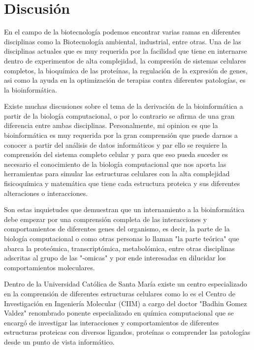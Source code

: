 \documentclass[a4paper, 12pt]{article}
\begin{document}
    
      
        
\section{Discusión}
    

En el campo de la biotecnología podemos encontrar varias ramas en diferentes disciplinas como la Biotecnología ambiental, industrial, entre otras. Una de las disciplinas actuales que es muy requerida por la facilidad que tiene en internarse dentro de experimentos de alta complejidad, la compresión de sistemas celulares completos, la bioquímica de las proteínas, la regulación de la expresión de genes, asi como la ayuda en la optimización de terapias contra diferentes patologías, es la bioinformática.

Existe muchas discusiones sobre el tema de la derivación de la bioinformática a partir de la biología computacional, o por lo contrario se afirma de una gran diferencia entre ambas disciplinas.
Personalmente, mi opinion es que la bioinformática es muy requerida por la gran comprensión que puede darnos a conocer a partir del análisis de datos informáticos y par ello se requiere la comprensión del sistema completo celular y para que eso pueda suceder es necesario el conocimiento de la biología computacional que nos aporta las herramientas para simular las estructuras celulares con la alta complejidad fisicoquímica y matemática que tiene cada estructura proteica y sus diferentes alteraciones o interacciones.
   
Son estas inquietudes que demuestran que un internamiento a la bioinformática debe empezar por una comprensión completa de las interacciones y comportamientos de diferentes genes del organismo, es decir, la parte de la biología computacional o como otras personas lo llaman "la parte teórica" que abarca la proteómica, transcriptómica, metabolómica, entre otras disciplinas adscritas al grupo de las "-omicas" y por ende interesadas en dilucidar los comportamientos moleculares. 
   
Dentro de la Universidad Católica de Santa María existe un centro especializado en la comprensión de diferentes estructuras celulares como lo es el Centro de Investigación en Ingeniería Molecular (CIIM) a cargo del doctor "Badhin Gomez Valdez" renombrado ponente especializado en química computacional que se encargó de investigar las interacciones y comportamientos de diferentes estructuras proteicas con diversos ligandos, proteínas o comprender las patologías desde un punto de vista informático.
   
\end{document}
